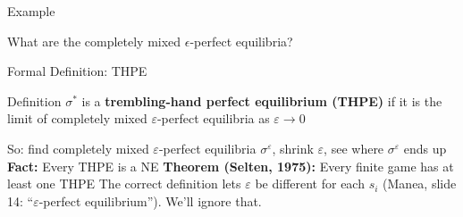 \begin{frame}{Example}
\centering
\begin{matrixgame}[top={$L$, $R$}, left={$U$, $D$}, player names={Player 1, Player 2}, w=1.6, br=<2->]
\end{matrixgame}
\bsk
\raggedright
What are the completely mixed $\epsilon$-perfect equilibria?
\bsk
{}
\end{frame}


\begin{frame}{Formal Definition: THPE}
\begin{block}{Definition}
$\sigma^*$ is a \textbf{trembling-hand perfect equilibrium (THPE)} if it is the limit of completely mixed $\varepsilon$-perfect equilibria as $\varepsilon\to 0$
\end{block}
\bsk
So: find completely mixed $\varepsilon$-perfect equilibria $\sigma^\varepsilon$, shrink $\varepsilon$, see where $\sigma^\varepsilon$ ends up
\bsk
\textbf{Fact:} Every THPE is a NE
\bsk
\textbf{Theorem (Selten, 1975):} Every finite game has at least one THPE
\vfill
{\footnotesize The correct definition lets $\varepsilon$ be different for each $s_i$ (Manea, slide 14: ``$\varepsilon$-perfect equilibrium''). We'll ignore that.}
\vspace{-0.2in}
\end{frame}

